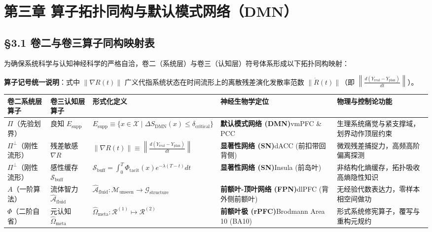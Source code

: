\documentclass[11pt,a4paper,oneside]{ctexart}
\begin{document}
\section{第三章 算子拓扑同构与默认模式网络（DMN）}

\subsection{§3.1 卷二与卷三算子同构映射表}

为确保系统科学与认知神经科学的严格自洽，卷二（系统层）与卷三（认知层）符号体系形成以下拓扑同构映射：


\begin{notebox}
\textbf{算子记号统一说明}：式中 $\|\nabla R(t)\|$ 广义代指系统状态在时间流形上的离散残差演化发散率范数 $\|\dot{R}(t)\|$（即 $\left\| \frac{d (Y_{\text{real}} - Y_{\text{plan}})}{dt} \right\|$）。
\end{notebox}

\begin{table}[htbp]
\centering
\small
\begin{tabular}{p{2.2cm}p{2.5cm}p{2.5cm}p{2.2cm}p{5.5cm}}
\toprule
卷二系统层算子 & 卷三认知层算子 & 形式化定义 & 神经生物学定位 & 物理与控制论功能 \\
\midrule
\textit{}$\Pi$（先验划界）\textit{} & \textit{}良知 $E_{\text{supp}}$\textit{} & $E_{\text{supp}} \equiv \{x \in \mathcal{X} \mid \Delta S_{\text{DMN}}(x) \le \delta_{\text{critical}}\}$ & \textbf{默认模式网络 (DMN)}\newline vmPFC \& PCC & 生理系统痛觉与紧支撑域，划界动作顶层约束 \\
\textit{}$\Pi^\perp$（刚性流形）\textit{} & \textit{}残差敏感 $\nabla R$\textit{} & $\|\nabla R(t)\| \equiv \left\| \frac{d (Y_{\text{real}} - Y_{\text{plan}})}{dt} \right\|$ & \textbf{显著性网络 (SN)}\newline dACC (前扣带回背侧) & 微观残差捕捉力，高频高阶偏离探测 \\
\textit{}$\Pi^\perp$（刚性流形）\textit{} & \textit{}感性缓存 $\mathcal{S}_{\text{buff}}$\textit{} & $\mathcal{S}_{\text{buff}} = \int_0^T \Phi_{\text{tacit}}(x) e^{-\lambda (T-t)} dt$ & \textbf{显著性网络 (SN)}\newline Insula (前岛叶) & 非结构化熵缓存，拓扑吸收高熵隐性知识 \\
\textit{}$A$（一阶算法）\textit{} & \textit{}流体智力 $\hat{\mathcal{A}}_{\text{fluid}}$\textit{} & $\hat{\mathcal{A}}_{\text{fluid}}: \mathcal{M}_{\text{unseen}} \to \mathcal{G}_{\text{structure}}$ & \textbf{前额叶-顶叶网络 (FPN)}\newline dlPFC (背外侧前额叶) & 无经验代数表达力，零样本相空间做功 \\
\textit{}$\Phi$（二阶自省）\textit{} & \textit{}元认知 $\hat{\Omega}_{\text{meta}}$\textit{} & $\hat{\Omega}_{\text{meta}}: \mathcal{R}^{(1)} \mapsto \mathcal{R}^{(2)}$ & \textbf{前额叶极 (rPFC)}\newline Brodmann Area 10 (BA10) & 形式系统修宪算子，覆写与重构元规约 \\
\bottomrule
\end{tabular}
\end{table}
\end{document}
